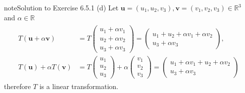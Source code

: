 \documentclass[letterpaper,10pt,english]{jupyterBook}
\begin{document}
\begin{sphinxadmonition}{note}{Solution to Exercise 6.5.1}
\sphinxAtStartPar
(d) Let \(\mathbf{u} = (u_1, u_2, v_3),\mathbf{v} = (v_1, v_2, v_3)\in \mathbb{R}^3\) and \(\alpha \in \mathbb{R}\)
\begin{equation*}
\begin{split} \begin{align*}
    T(\mathbf{u} + \alpha \mathbf{v}) 
    &= T\begin{pmatrix} u_1 + \alpha v_1 \\ u_2 + \alpha v_2 \\ u_3 + \alpha v_3 \end{pmatrix}
    = \begin{pmatrix} u_1 + u_2 + \alpha v_1 + \alpha v_2 \\  u_3 + \alpha v_3 \end{pmatrix} , \\
    T(\mathbf{u}) + \alpha T(\mathbf{v}) 
    &= T\begin{pmatrix} u_1 \\ u_2 \\ u_3 \end{pmatrix} + \alpha \begin{pmatrix} v_1 \\ v_2 \\ v_3 \end{pmatrix}
    = \begin{pmatrix} u_1 + \alpha v_1 + u_2 + \alpha v_2 \\  u_3 + \alpha v_3 \end{pmatrix}
\end{align*} \end{split}
\end{equation*}
\sphinxAtStartPar
therefore \(T\) is a linear transformation.


\end{sphinxadmonition}
\end{document}
